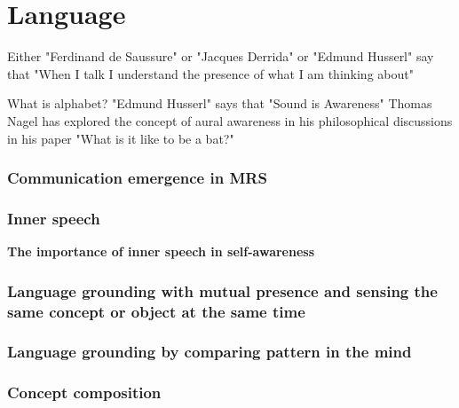 \chapter{Language}
Either "Ferdinand de Saussure" or "Jacques Derrida" or "Edmund Husserl" say that "When I talk I understand the presence of what I am thinking about"

What is alphabet? "Edmund Husserl" says that "Sound is Awareness" Thomas Nagel has explored the concept of aural awareness in his philosophical discussions in his paper "What is it like to be a bat?"

    \subsection{Communication emergence in MRS}

    \subsection{Inner speech}
        \textbf{The importance of inner speech in self-awareness} 

    \subsection{Language grounding with mutual presence and sensing the same concept or object at the same time}

    \subsection{Language grounding by comparing pattern in the mind}

    \subsection{Concept composition}



